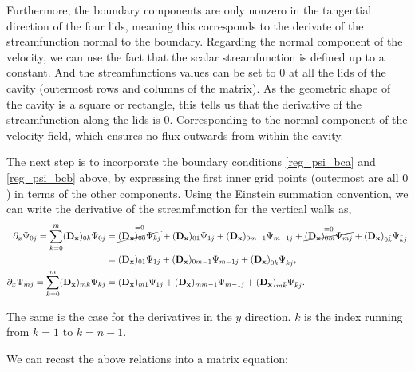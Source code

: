 Furthermore, the boundary components are only nonzero in the tangential
direction of the four lids, meaning this corresponds to the derivate of the
streamfunction normal to the boundary. Regarding the normal component of the
velocity, we can use the fact that the scalar streamfunction is defined up to a
constant. And the streamfunctions values can be set to $0$ at all the lids of
the cavity (outermost rows and columns of the matrix). As the geometric shape
of the cavity is a square or rectangle, this tells us that the derivative of
the streamfunction along the lids is $0$. Corresponding to the normal component
of the velocity field, which ensures no flux outwards from within the cavity.

The next step is to incorporate the boundary conditions \eqref{reg_psi_bca} and
\eqref{reg_psi_bcb} above, by expressing the first inner grid points (outermost
are all $0$) in terms of the other components. Using the Einstein summation
convention, we can write the derivative of the streamfunction for the
vertical walls as,
\begin{align}
\partial_x \Psi_{0j} = \sum_{k=0}^{m} (\mathbf{D_x})_{0k} \Psi_{0j}
  &= \overset{=0}{\cancel{(\mathbf{D_x})_{00}\Psi_{kj}}} + (\mathbf{D_x})_{01}\Psi_{1j} 
  + (\mathbf{D_x})_{0m-1}\Psi_{m-1j} +  \overset{=0}{\cancel{(\mathbf{D_x})_{0m}\Psi_{mj}}}
  + (\mathbf{D_x})_{0\bar{k}}\Psi_{\bar{k}j} \nonumber \\
  &= (\mathbf{D_x})_{01}\Psi_{1j} + (\mathbf{D_x})_{0m-1}\Psi_{m-1j}
  + (\mathbf{D_x})_{0\bar{k}}\Psi_{\bar{k}j}, \\
\partial_x \Psi_{mj} = \sum_{k=0}^{m} (\mathbf{D_x})_{mk} \Psi_{kj}
  &= (\mathbf{D_x})_{m1}\Psi_{1j} + (\mathbf{D_x})_{mm-1}\Psi_{m-1j} 
  + (\mathbf{D_x})_{m\bar{k}}\Psi_{\bar{k}j}.
\end{align}

The same is the case for the derivatives in the $y$ direction. $\bar{k}$ is the
index running from $k=1$ to $k=n-1$.

We can recast the above relations into a matrix equation:


